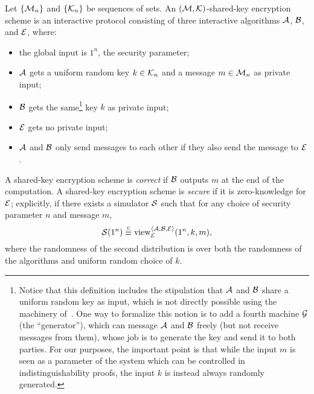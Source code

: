 

\begin{dfn}
Let $\{\mathcal{M}_n\}$ and $\{\mathcal{K}_n\}$ be sequences of sets. An $(\mathcal{M}, \mathcal{K})$-shared-key
encryption scheme is an interactive protocol consisting of three interactive
algorithms $\mathcal{A}$, $\mathcal{B}$, and $\mathcal{E}$, where:
\begin{itemize}
  \item the global input is $1^n$, the security parameter;
  \item $\mathcal{A}$ gets a uniform random key $k\in\mathcal{K}_n$ and a message $m\in\mathcal{M}_n$ as private input;
  \item $\mathcal{B}$ gets the same\footnote{
    Notice that this definition includes the stipulation that $\mathcal{A}$ and $\mathcal{B}$ share a
    uniform random key as input, which is not directly possible using the machinery
    of~.
    One way to formalize this notion is to add a fourth machine $\mathcal{G}$ (the
    ``generator''), which can message $\mathcal{A}$ and $\mathcal{B}$ freely (but not receive
    messages from them), whose job is to generate the key and send it to both
    parties. For our purposes, the important point is that while the input $m$
    is seen as a parameter of the system which can be controlled in
    indistinguishability proofs, the input $k$ is instead always randomly
    generated.
    } key $k$ as private input;
  \item $\mathcal{E}$ gets no private input;
  \item $\mathcal{A}$ and $\mathcal{B}$ only send messages to each other if they also send the
    message to $\mathcal{E}$.
\end{itemize}

A shared-key encryption scheme is \emph{correct} if $\mathcal{B}$ outputs $m$ at the
end of the computation. A shared-key encryption scheme is \emph{secure} if it
is zero-knowledge for $\mathcal{E}$; explicitly, if there exists a simulator $\mathcal{S}$
such that for any choice of security parameter $n$ and message $m$, \[
  \mathcal{S}(1^n) \overset{\text{c}}{\equiv} \operatorname{view}_{\mathcal{E}}^{\langle\mathcal{A}, \mathcal{B}, \mathcal{E}\rangle}(1^n, k, m),
\]where the randomness of the second distribution is over both the randomness of
the algorithms and uniform random choice of $k$.
\end{dfn}


